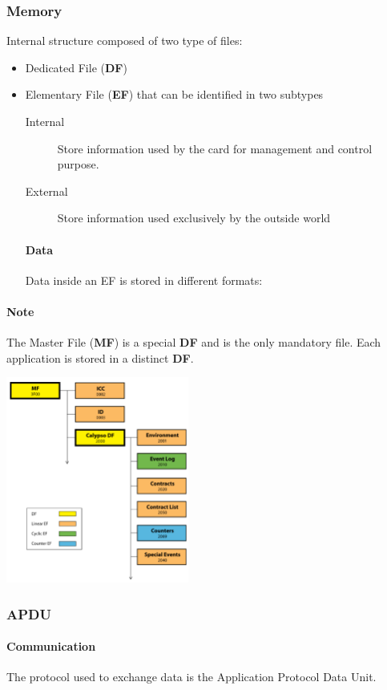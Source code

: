 \subsubsection{Memory}
    Internal structure composed of two type of files:
\begin{itemize}
    \item Dedicated File (\textbf{DF})
    \item Elementary File (\textbf{EF}) that can be identified in two subtypes
    \begin{description}
        \item[Internal] Store information used by the card for management and
        control purpose.
        \item[External] Store information used exclusively by the outside world
    \end{description}
    
    \paragraph{Data}
    Data inside an EF is stored in different formats:
\end{itemize}

\paragraph{Note} The Master File (\textbf{MF}) is a special \textbf{DF}
and is the only mandatory file. Each application is stored in a distinct
\textbf{DF}.

\begin{center}
    \includegraphics[width=6cm]{img/7816}
\end{center}

\subsubsection{APDU}


\paragraph{Communication}
The protocol used to exchange data is the Application Protocol Data Unit.


